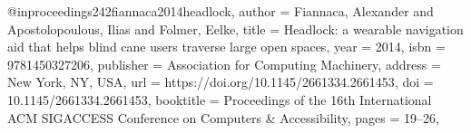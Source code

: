 @inproceedings{242fiannaca2014headlock,
author = {Fiannaca, Alexander and Apostolopoulous, Ilias and Folmer, Eelke},
title = {Headlock: a wearable navigation aid that helps blind cane users traverse large open spaces},
year = {2014},
isbn = {9781450327206},
publisher = {Association for Computing Machinery},
address = {New York, NY, USA},
url = {https://doi.org/10.1145/2661334.2661453},
doi = {10.1145/2661334.2661453},
booktitle = {Proceedings of the 16th International ACM SIGACCESS Conference on Computers \& Accessibility},
pages = {19–26},
}